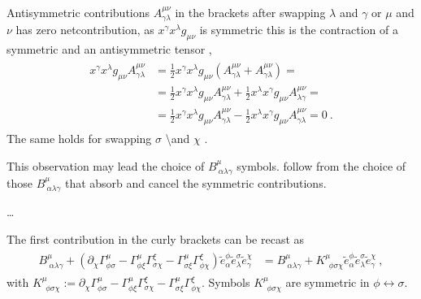 \documentclass[letterpaper,10pt,english]{jupyterBook}
\begin{document}
\sphinxAtStartPar
Anti\sphinxhyphen{}symmetric contributions \(A^{\mu \nu}_{\gamma \lambda}\) in the brackets after swapping \(\lambda\) and \(\gamma\) or \(\mu\) and \(\nu\) has zero net\sphinxhyphen{}contribution, as \(x^\gamma x^\lambda g_{\mu \nu}\) is symmetric \sphinxhyphen{} this is the contraction of a symmetric and an anti\sphinxhyphen{}symmetric tensor \sphinxhyphen{},
\begin{equation*}
\begin{split}\begin{aligned}
  x^\gamma x^\lambda g_{\mu \nu} A^{\mu \nu}_{\gamma \lambda}
  & = \frac{1}{2} x^\gamma x^\lambda g_{\mu \nu} \left( A^{\mu \nu}_{\gamma \lambda} + A^{\mu \nu}_{\gamma \lambda} \right) = \\
  & = \frac{1}{2} x^\gamma x^\lambda g_{\mu \nu} A^{\mu \nu}_{\gamma \lambda} + \frac{1}{2} x^\lambda x^\gamma g_{\mu \nu} A^{\mu \nu}_{\lambda \gamma} = \\
  & = \frac{1}{2} x^\gamma x^\lambda g_{\mu \nu} A^{\mu \nu}_{\gamma \lambda} - \frac{1}{2} x^\lambda x^\gamma g_{\mu \nu} A^{\mu \nu}_{\gamma \lambda} = 0 \ .
\end{aligned}\end{split}
\end{equation*}
\sphinxAtStartPar
The same holds for swapping \(\sigma\) \textbackslash{}and \(\chi\) \sphinxhyphen{}  .

\sphinxAtStartPar
This observation may lead the choice of \(B^{\mu}_{\ \alpha \lambda \gamma}\) symbols.  follow from the choice of those \(B^{\mu}_{\ \alpha \lambda \gamma}\) that absorb and cancel the symmetric contributions.

\sphinxAtStartPar
…

\sphinxAtStartPar
The first contribution in the curly brackets can be recast as
\begin{equation*}
\begin{split}\begin{aligned}
  B^{\mu}_{\ \alpha \lambda \gamma} + \left( \partial_{\chi} \Gamma^{\mu}_{\phi \sigma} - \Gamma^{\mu}_{\phi \xi} \Gamma^{\xi}_{\sigma \chi} - \Gamma^{\mu}_{\sigma \xi} \Gamma^{\xi}_{\phi \chi} \right) \widetilde{e}^{\phi}_{\alpha} \widetilde{e}^{\sigma}_{\lambda} \widetilde{e}^{\chi}_{\gamma}
  & = B^{\mu}_{\ \alpha \lambda \gamma} + K^{\mu}_{\ \ \phi \sigma \chi} \widetilde{e}^{\phi}_{\alpha} \widetilde{e}^{\sigma}_{\lambda} \widetilde{e}^{\chi}_{\gamma} \ ,
\end{aligned}\end{split}
\end{equation*}
\sphinxAtStartPar
with \(K^{\mu}_{\ \ \phi \sigma \chi} := \partial_{\chi} \Gamma^{\mu}_{\phi \sigma} - \Gamma^{\mu}_{\phi \xi} \Gamma^{\xi}_{\sigma \chi} - \Gamma^{\mu}_{\sigma \xi} \Gamma^{\xi}_{\phi \chi}\). Symbols \(K^{\mu}_{\ \ \phi \sigma \chi}\) are symmetric in \(\phi \leftrightarrow \sigma\).
\end{document}

